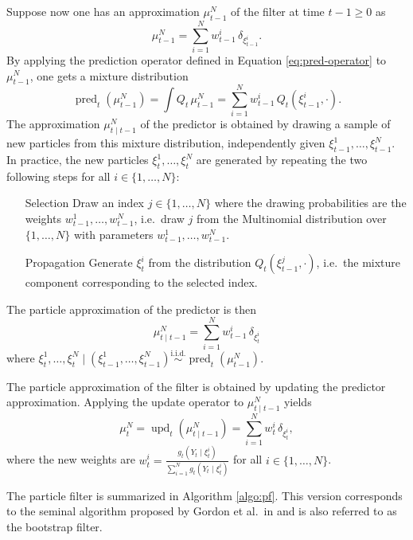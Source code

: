 \documentclass{article}
\newcommand{\simiid}{\overset{\text{i.i.d.}}{\sim}}
\DeclareMathOperator{\pred}{pred}
\DeclareMathOperator{\upd}{upd}
\begin{document}
Suppose now one has an approximation $\mu^N_{t-1}$ of the filter at time $t-1 \geq 0$ as
\begin{equation*}
    \mu^N_{t-1} = \sum_{i=1}^N w^i_{t-1} \, \delta_{\xi^i_{t-1}}.
\end{equation*}
By applying the prediction operator defined in Equation \eqref{eq:pred-operator} to $\mu^N_{t-1}$, one gets a mixture distribution
\begin{equation}
\label{eq:pred-PF}
    \pred_t(\mu^N_{t-1}) = \int Q_t \, \mu^N_{t-1}  = \sum_{i=1}^N w^i_{t-1} \, Q_t(\xi^i_{t-1},\cdot).
\end{equation}
The approximation $\mu^N_{t \mid t-1}$ of the predictor is obtained by drawing a sample of new particles from this mixture distribution, independently given $\xi^1_{t-1},\dots,\xi^N_{t-1}$. In practice, the new particles $\xi^1_t,\dots,\xi^N_t$ are generated by repeating the two following steps for all $i \in \{1,\dots,N\}$:
\begin{itemize}
    \item[Selection] Draw an index $j \in \{1,\dots,N\}$ where the drawing probabilities are the weights $w^1_{t-1},\dots,w^N_{t-1}$, i.e.\ draw $j$ from the Multinomial distribution over $\{1,\dots,N\}$ with parameters $w^1_{t-1},\dots,w^N_{t-1}$.
    \item[Propagation] Generate $\xi^i_t$ from the distribution $Q_t(\xi^j_{t-1},\cdot)$, i.e.\ the mixture component corresponding to the selected index.
\end{itemize}
The particle approximation of the predictor is then
\begin{equation*}
    \mu^N_{t \mid t-1} = \sum_{i=1}^N w^i_{t-1} \, \delta_{\xi^i_t}
\end{equation*}
where $\xi^1_t,\dots,\xi^N_t \mid (\xi^1_{t-1},\dots,\xi^N_{t-1}) \simiid \pred_t(\mu^N_{t-1})$.

The particle approximation of the filter is obtained by updating the predictor approximation. Applying the update operator to $\mu^N_{t \mid t-1}$ yields
\begin{equation*}
    \mu^N_t = \upd_t(\mu^N_{t \mid t-1}) = \sum_{i=1}^N w^i_t \, \delta_{\xi^i_t},
\end{equation*}
where the new weights are $\displaystyle w^i_t = \frac{g_t(Y_t \mid \xi^i_t)}{\sum_{i=1}^N g_t(Y_t \mid \xi^i_t)}$ for all $i \in \{1,\dots,N\}$.

The particle filter is summarized in Algorithm \ref{algo:pf}. This version corresponds to the seminal algorithm proposed by Gordon et al.\ in \cite{Gordon1993} and is also referred to as the bootstrap filter.
\end{document}
